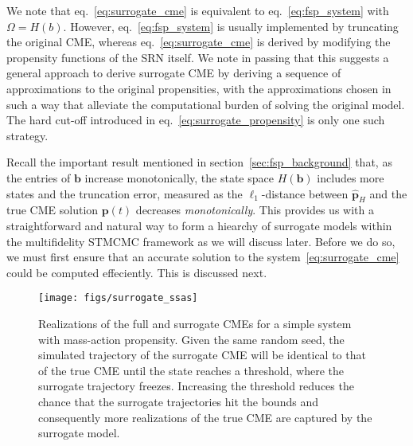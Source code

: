 \documentclass[1p]{article}
\begin{document}
We note that eq.~\eqref{eq:surrogate_cme} is equivalent to eq.~\eqref{eq:fsp_system} with $\Omega = H(b)$. However, eq.~\eqref{eq:fsp_system} is usually implemented by truncating the original CME, whereas eq.~\eqref{eq:surrogate_cme} is derived by modifying the propensity functions of the SRN itself. We note in passing that this suggests a general approach to derive surrogate CME by deriving a sequence of approximations to the original propensities, with the approximations chosen in such a way that alleviate the computational burden of solving the original model. The hard cut-off introduced in eq.~\eqref{eq:surrogate_propensity} is only one such strategy.

Recall the important result mentioned in section~\ref{sec:fsp_background} that, as the entries of $\bm{b}$ increase monotonically, the state space $H(\bm{b})$ includes more states and the truncation error, measured as the $\ell_1$-distance between $\widehat{\bm{p}}_{H}$ and the true CME solution $\bm{p}(t)$ decreases \emph{monotonically}. This provides us with a straightforward and natural way to form a hiearchy of surrogate models within the multifidelity STMCMC framework as we will discuss later.
Before we do so, we must first ensure that an accurate solution to the system~\eqref{eq:surrogate_cme} could be computed effeciently. This is discussed next.

\begin{figure}[H]
  \texttt{[image: figs/surrogate\_ssas]}
  \caption{Realizations of the full and surrogate CMEs for a simple system with mass-action propensity. Given the same random seed, the simulated trajectory of the surrogate CME will be identical to that of the true CME until the state reaches a threshold, where the surrogate trajectory freezes.
  Increasing the threshold reduces the chance that the surrogate trajectories hit the bounds and consequently more realizations of the true CME are captured by the surrogate model.
  }
  \label{fig:surrogate_cme_ssas}
\end{figure}
\end{document}
